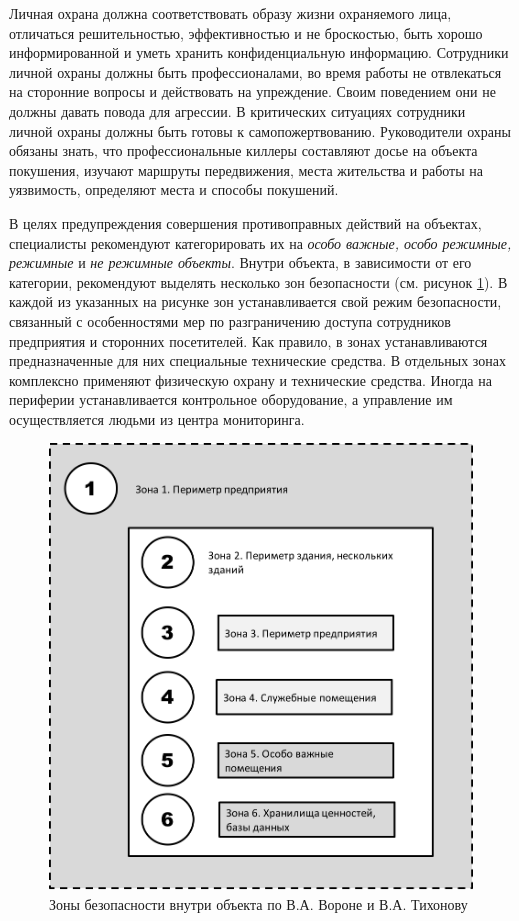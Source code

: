 \documentclass[a4paper,12pt,fleqn]{article} %
\begin{document}
Личная охрана должна соответствовать образу жизни охраняемого лица, отличаться решительностью, эффективностью и не броскостью, быть хорошо информированной и уметь хранить конфиденциальную информацию. Сотрудники личной охраны должны быть профессионалами, во время работы не отвлекаться на сторонние вопросы и действовать на упреждение. Своим поведением они не должны давать повода для агрессии. В критических ситуациях сотрудники личной охраны должны быть готовы к самопожертвованию. Руководители охраны обязаны знать, что профессиональные киллеры составляют досье на объекта покушения, изучают маршруты передвижения, места жительства и работы на уязвимость, определяют места и способы покушений.

В целях предупреждения совершения противоправных действий на объектах, специалисты рекомендуют категорировать их на \textit{особо важные, особо режимные, режимные} и \textit{не режимные объекты}. Внутри объекта, в зависимости от его категории, рекомендуют выделять несколько зон безопасности (см. рисунок \ref{image2}). В каждой из указанных на рисунке зон устанавливается свой режим безопасности, связанный с особенностями мер по разграничению доступа сотрудников предприятия и сторонних посетителей. Как правило, в зонах устанавливаются предназначенные для них специальные технические средства. В отдельных зонах комплексно применяют физическую охрану и технические средства. Иногда на периферии устанавливается контрольное оборудование, а управление им осуществляется людьми из центра мониторинга.

\begin{figure}[h]
	\centering
	\includegraphics[scale=0.6]{img2}
	\caption{Зоны безопасности внутри объекта по В.А. Вороне и В.А. Тихонову}
	\label{image2}
\end{figure}
\end{document}
